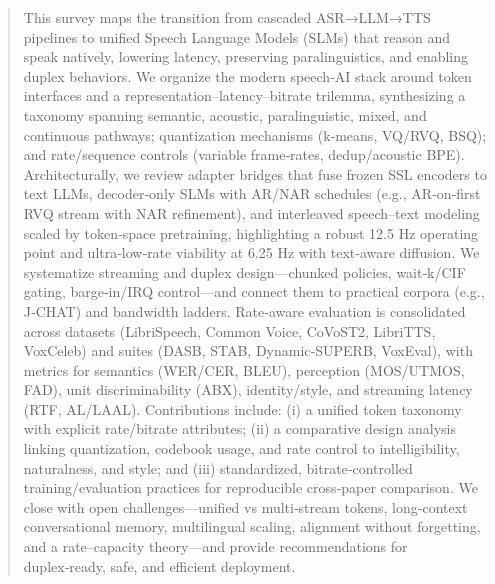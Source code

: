 
\begin{abstract}
This survey maps the transition from cascaded ASR→LLM→TTS pipelines to unified Speech Language Models (SLMs) that reason and speak natively, lowering latency, preserving paralinguistics, and enabling duplex behaviors. We organize the modern speech‑AI stack around token interfaces and a representation–latency–bitrate trilemma, synthesizing a taxonomy spanning semantic, acoustic, paralinguistic, mixed, and continuous pathways; quantization mechanisms (k‑means, VQ/RVQ, BSQ); and rate/sequence controls (variable frame‑rates, dedup/acoustic BPE). Architecturally, we review adapter bridges that fuse frozen SSL encoders to text LLMs, decoder‑only SLMs with AR/NAR schedules (e.g., AR‑on‑first RVQ stream with NAR refinement), and interleaved speech–text modeling scaled by token‑space pretraining, highlighting a robust 12.5 Hz operating point and ultra‑low‑rate viability at 6.25 Hz with text‑aware diffusion. We systematize streaming and duplex design—chunked policies, wait‑k/CIF gating, barge‑in/IRQ control—and connect them to practical corpora (e.g., J‑CHAT) and bandwidth ladders. Rate‑aware evaluation is consolidated across datasets (LibriSpeech, Common Voice, CoVoST2, LibriTTS, VoxCeleb) and suites (DASB, STAB, Dynamic‑SUPERB, VoxEval), with metrics for semantics (WER/CER, BLEU), perception (MOS/UTMOS, FAD), unit discriminability (ABX), identity/style, and streaming latency (RTF, AL/LAAL). Contributions include: (i) a unified token taxonomy with explicit rate/bitrate attributes; (ii) a comparative design analysis linking quantization, codebook usage, and rate control to intelligibility, naturalness, and style; and (iii) standardized, bitrate‑controlled training/evaluation practices for reproducible cross‑paper comparison. We close with open challenges—unified vs multi‑stream tokens, long‑context conversational memory, multilingual scaling, alignment without forgetting, and a rate–capacity theory—and provide recommendations for duplex‑ready, safe, and efficient deployment.
\end{abstract}
